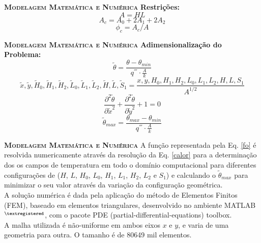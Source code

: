 \documentclass[xcolor=dvipsnames,10pt]{beamer}
\begin{document}
\begin{frame}{}
	\begin{block}{\textbf{\textsc{Modelagem Matemática e Numérica}}}
	\textbf{Restrições: }
		\begin{equation}
			A = HL \label{area_total}
		\end{equation}
		\begin{equation}
			A_{c} = A_{0} + 2A_{1} + 2A_{2} \label{area_cavidade}
		\end{equation}\begin{equation}
			\phi_{c} = A_{c}/A \label{fi}
		\end{equation}
		
	\end{block} 
\end{frame}
\begin{frame}
\begin{block}{\textbf{\textsc{Modelagem Matemática e Numérica}}}
\textbf{Adimensionalização do Problema:}
\begin{equation}
			\tilde{\theta} = \frac{\theta - \theta_{min}}{q^{'''}\cdot\frac{A}{k}}\label{tadim}
		\end{equation}
		\begin{equation}
				\tilde{x},\tilde{y},\tilde{H}_{0},\tilde{H}_{1},\tilde{H}_{2},\tilde{L}_{0},\tilde{L}_{1},\tilde{L}_{2},\tilde{H},\tilde{L},\tilde{S}_{1} = \frac{x,y,H_{0},H_{1},H_{2},L_{0},L_{1},L_{2},H,L,S_{1}}{A^{1/2}}\label{vadim}
		\end{equation}
		\begin{equation}
				\frac{\partial ^{2}\tilde{\theta}}{\partial \tilde{x}^{2}}+\frac{\partial ^{2} \tilde{\theta}}{\partial \tilde{y}^{2}}+1=0\label{calor}
		\end{equation}
		\begin{equation}
			\tilde{\theta}_{max}=\frac{\theta_{max}-\theta_{min}}{q^{'''}\cdot\frac{A}{k}}\label{fo}
		\end{equation}
		\end{block}
\end{frame}
\begin{frame}
\begin{block}{\textbf{\textsc{Modelagem Matemática e Numérica}}}
\justifying
	\setlength{\parindent}{1cm}
		A função representada pela Eq. \ref{fo} é resolvida numericamente através da resolução da Eq. \ref{calor} para a determinação dos os campos de temperatura em todo o domínio computacional para diferentes configurações de ($H$, $L$, $H_{0}$, $L_{0}$, $H_{1}$, $L_{1}$, $H_{2}$, $L_{2}$ e $S_{1}$) e calculando o $\tilde{\theta}_{max}$ para minimizar o seu valor através da variação da configuração geométrica.\\ A solução numérica é dada pela aplicação do método de Elementos Finitos (FEM), baseado em elementos triangulares, desenvolvido no ambiente MATLAB$^{\tiny ®}$, com o pacote PDE (partial-differential-equations) toolbox.\\ A malha utilizada é não-uniforme em ambos eixos $x$ e $y$, e varia de uma geometria para outra. O tamanho é de  80649 mil elementos.
	\end{block}
\end{frame}
\end{document}
